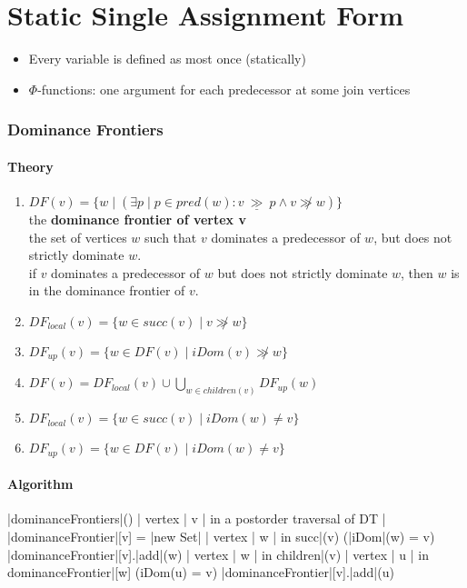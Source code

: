 \documentclass[a4paper,12pt, notitlepage]{article}
\newcommand{\gge}{\ \underline{\gg}\ }
\newcommand{\existe}[3]{(\exists #1 \mid #2 : #3)}
\begin{document}
\section*{Static Single Assignment Form}
\begin{itemize}
\item Every variable is defined as most once (statically)
\item $\Phi$-functions: one argument for each predecessor at some join vertices
\end{itemize}

\subsubsection*{Dominance Frontiers}
\paragraph*{Theory}
\begin{enumerate}
\item $DF(v) = \{w \mid \existe{p}{p \in pred(w)}{v \gge p \land v \not\gg w}\}$
\\ the \textbf{dominance frontier of vertex v}
\\ the set of vertices $w$ such that $v$ dominates a predecessor of $w$, but does
not strictly dominate $w$.
\\ if $v$ dominates a predecessor of $w$ but does not strictly dominate $w$,
    then $w$ is in the dominance frontier of $v$.
\item $DF_{local}(v) = \{w \in succ(v) \mid v \not\gg w\}$
\item $DF_{up}(v) = \{w \in DF(v) \mid iDom(v) \not\gg w\}$
\item $DF(v) = DF_{local}(v) \cup 
    \displaystyle \bigcup_{w \in children(v)} DF_{up}(w)$
\item $DF_{local}(v) = \{w \in succ(v) \mid iDom(w) \not= v\}$
\item $DF_{up}(v) = \{w \in DF(v) \mid iDom(w) \not= v\}$
\end{enumerate}

\paragraph*{Algorithm}
\begin{program}
\PROC |dominanceFrontiers|() \BODY
    \FOREACH | vertex | v | in a postorder traversal of DT | \DO
        |dominanceFrontier|[v] = |new Set|
        \FOREACH | vertex | w | in succ|(v) \DO
            \IF (|iDom|(w) \not= v) \AR*
                |dominanceFrontier|[v].|add|(w)
            \FI
        \OD
        \FOREACH | vertex | w | in children|(v) \DO
            \FOREACH | vertex | u | in dominanceFrontier|[w] \DO
                \IF (iDom(u) \not= v) \AR*
                    |dominanceFrontier|[v].|add|(u)
                \FI
            \OD
        \OD
    \OD
\end{program}
\end{document}
